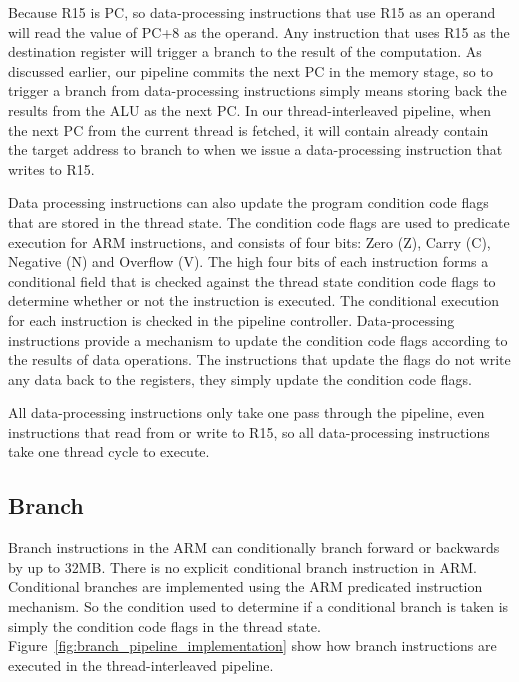 Because R15 is PC, so data-processing instructions that use R15 as an operand will read the value of PC+8 as the operand. 
Any instruction that uses R15 as the destination register will trigger a branch to the result of the computation.
As discussed earlier, our pipeline commits the next PC in the memory stage, so to trigger a branch from data-processing instructions simply means storing back the results from the ALU as the next PC.
In our thread-interleaved pipeline, when the next PC from the current thread is fetched, it will contain already contain the target address to branch to when we issue a data-processing instruction that writes to R15. 

Data processing instructions can also update the program condition code flags that are stored in the thread state. 
The condition code flags are used to predicate execution for ARM instructions, and consists of four bits: Zero (Z), Carry (C), Negative (N) and Overflow (V). 
The high four bits of each instruction forms a conditional field that is checked against the thread state condition code flags to determine whether or not the instruction is executed. 
The conditional execution for each instruction is checked in the pipeline controller. 
Data-processing instructions provide a mechanism to update the condition code flags according to the results of data operations.
The instructions that update the flags do not write any data back to the registers, they simply update the condition code flags.

All data-processing instructions only take one pass through the pipeline, even instructions that read from or write to R15, so all data-processing instructions take one thread cycle to execute. 
\subsection{Branch}
Branch instructions in the ARM can conditionally branch forward or backwards by up to 32MB.
There is no explicit conditional branch instruction in ARM.
Conditional branches are implemented using the ARM predicated instruction mechanism.
So the condition used to determine if a conditional branch is taken is simply the condition code flags in the thread state. 
Figure~\ref{fig:branch_pipeline_implementation} show how branch instructions are executed in the thread-interleaved pipeline.

